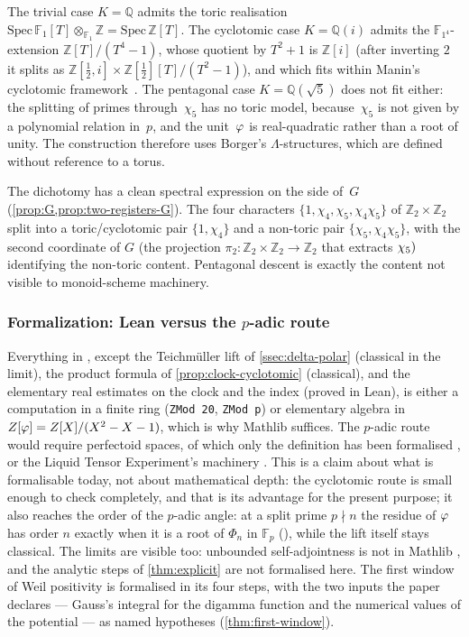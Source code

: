 The trivial case $K=\mathbb{Q}$ admits the toric realisation
$\mathrm{Spec}\,\mathbb{F}_1[T]\otimes_{\mathbb{F}_1}\mathbb{Z}
=\mathrm{Spec}\,\mathbb{Z}[T]$.
The cyclotomic case $K=\mathbb{Q}(i)$ admits the
$\mathbb{F}_{1^4}$-extension
$\mathbb{Z}[T]/(T^4-1)$, whose quotient by $T^2+1$ is $\mathbb{Z}[i]$ (after inverting
$2$ it splits as $\mathbb{Z}[\tfrac12,i]\times\mathbb{Z}[\tfrac12][T]/(T^2-1)$), and which
fits within Manin's cyclotomic framework~\cite{manin08}.
The pentagonal case $K = \mathbb{Q}(\sqrt{5})$ does not fit
either: the splitting of primes through~$\chi_5$ has no toric
model, because~$\chi_5$ is not given by a polynomial relation
in~$p$, and the unit~$\varphi$ is real-quadratic rather than a
root of unity.  The construction therefore uses Borger's $\Lambda$-structures,
which are defined without reference to a torus.

The dichotomy has a clean spectral expression on the side of~$G$ (\cref{prop:G,prop:two-registers-G}).
The four characters $\{1,\chi_4,\chi_5,\chi_4\chi_5\}$ of
$\mathbb{Z}_2\times\mathbb{Z}_2$ split into a toric/cyclotomic
pair $\{1,\chi_4\}$ and a non-toric pair $\{\chi_5,\chi_4\chi_5\}$,
with the second coordinate of $G$ \textup{(}the projection
$\pi_2\colon\mathbb{Z}_2\times\mathbb{Z}_2\to\mathbb{Z}_2$ that
extracts $\chi_5\textup{)}$ identifying the non-toric
content.  Pentagonal descent is exactly the content not visible
to monoid-scheme machinery.

\subsubsection{Formalization: Lean versus the $p$-adic route}\label{ssec:lean-vs-padic}

Everything in ,
except the Teichm\"uller lift of \cref{ssec:delta-polar}
(classical in the limit), the product formula of
\cref{prop:clock-cyclotomic} (classical), and the
elementary real estimates on the clock and the index
(proved in Lean), is either a computation in a finite ring
(\texttt{ZMod 20}, \texttt{ZMod p}) or elementary algebra in
$Z[\varphi]=Z[X]/(X^2-X-1)$, which is why Mathlib suffices.  The $p$-adic route would
require perfectoid spaces, of which only the definition has been formalised
\cite{buzzard20}, or the Liquid Tensor Experiment's machinery \cite{scholze22}.
This is a claim about what is formalisable today, not about mathematical depth:
the cyclotomic route is small enough to check
completely, and that is its advantage for the present
purpose; it also reaches the order of the $p$-adic
angle: at a split prime $p\nmid n$ the residue of
$\varphi$ has order $n$ exactly when it is a root of
$\Phi_n$ in $\mathbb{F}_p$
(), while the lift itself stays classical.  The limits are visible too: unbounded
self-adjointness is not in Mathlib \cite{gonzalez25hp}, and the analytic steps of
\cref{thm:explicit} are not formalised here.  The first window of Weil positivity is
formalised in its four steps, with the two inputs the paper declares --- Gauss's
integral for the digamma function and the numerical values of the potential --- as
named hypotheses (\cref{thm:first-window}).

